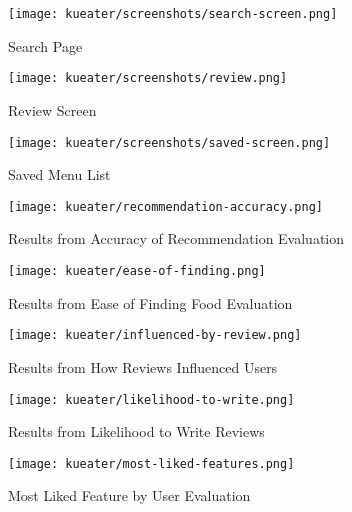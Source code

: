 \begin{figure}[h!]
    \centering
    \texttt{[image: kueater/screenshots/search-screen.png]}
    \caption{Search Page}
    \label{fig:search-screen}
\end{figure}

\begin{figure}[h!]
    \centering
    \texttt{[image: kueater/screenshots/review.png]}
    \caption{Review Screen}
    \label{fig:review-screen}
\end{figure}

\begin{figure}[h!]
    \centering
    \texttt{[image: kueater/screenshots/saved-screen.png]}
    \caption{Saved Menu List}
    \label{fig:saved-screen}
\end{figure}



\begin{figure}[h!]
    \centering
    \texttt{[image: kueater/recommendation-accuracy.png]}
    \caption{Results from Accuracy of Recommendation Evaluation}
    \label{fig:recommendation-accuracy}
\end{figure}

\begin{figure}[h!]
    \centering
    \texttt{[image: kueater/ease-of-finding.png]}
    \caption{Results from Ease of Finding Food Evaluation}
    \label{fig:ease-of-finding}
\end{figure}

\begin{figure}[h!]
    \centering
    \texttt{[image: kueater/influenced-by-review.png]}
    \caption{Results from How Reviews Influenced Users}
    \label{fig:influenced-by-review}
\end{figure}

\begin{figure}[h!]
    \centering
    \texttt{[image: kueater/likelihood-to-write.png]}
    \caption{Results from Likelihood to Write Reviews}
    \label{fig:likelihood-to-write}
\end{figure}

\begin{figure}[h!]
    \centering
    \texttt{[image: kueater/most-liked-features.png]}
    \caption{Most Liked Feature by User Evaluation}
    \label{fig:most-liked-features}
\end{figure}

